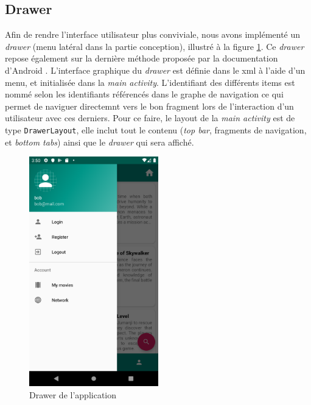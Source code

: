 \subsection{Drawer}
Afin de rendre l'interface utilisateur plus conviviale, nous avons implémenté un \textit{drawer} (menu latéral dans la partie conception), illustré à la figure \ref{drawer}. Ce \textit{drawer} repose également sur la dernière méthode proposée par la documentation d'Android \cite{docandroid}. L'interface graphique du \textit{drawer} est définie dans le \acrshort{xml} à l'aide d'un menu, et initialisée dans la \textit{main activity}. L'identifiant des différents items est nommé selon les identifiants référencés dans le graphe de navigation ce qui permet de naviguer directemnt vers le bon fragment lors de l'interaction d'un utilisateur avec ces derniers. Pour ce faire, le layout de la \textit{main activity} est de type \texttt{DrawerLayout}, elle inclut tout le contenu (\textit{top bar}, fragments de navigation, et \textit{bottom tabs}) ainsi que le \textit{drawer} qui sera affiché.
\begin{figure}
    \begin{center}
        \includegraphics[width=0.5\textwidth]{img/screenshots/Drawer.png}
    \end{center}
    \caption{Drawer de l'application}
    \label{drawer}
\end{figure}

